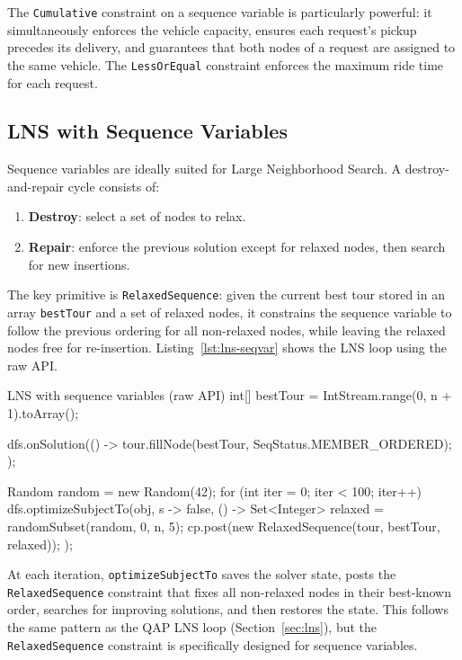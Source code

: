 \documentclass[11pt, a4paper]{scrartcl}
\begin{document}
The \texttt{Cumulative} constraint on a sequence variable is particularly powerful: it simultaneously enforces the vehicle capacity, ensures each request's pickup precedes its delivery, and guarantees that both nodes of a request are assigned to the same vehicle. The \texttt{LessOrEqual} constraint enforces the maximum ride time for each request.

\subsection{LNS with Sequence Variables}
\label{sec:lns-seqvar}

Sequence variables are ideally suited for Large Neighborhood Search. A destroy-and-repair cycle consists of:
\begin{enumerate}
    \item \textbf{Destroy}: select a set of nodes to relax.
    \item \textbf{Repair}: enforce the previous solution except for relaxed nodes, then search for new insertions.
\end{enumerate}

The key primitive is \texttt{RelaxedSequence}: given the current best tour stored in an array \texttt{bestTour} and a set of relaxed nodes, it constrains the sequence variable to follow the previous ordering for all non-relaxed nodes, while leaving the relaxed nodes free for re-insertion. 
Listing~\ref{lst:lns-seqvar} shows the LNS loop using the raw API.

\begin{codebox}[label={lst:lns-seqvar}]{LNS with sequence variables (raw API)}
int[] bestTour = IntStream.range(0, n + 1).toArray();

dfs.onSolution(() -> {
    tour.fillNode(bestTour, SeqStatus.MEMBER_ORDERED);
});

Random random = new Random(42);
for (int iter = 0; iter < 100; iter++) {
    dfs.optimizeSubjectTo(obj, s -> false, () -> {
        Set<Integer> relaxed = randomSubset(random, 0, n, 5);
        cp.post(new RelaxedSequence(tour, bestTour, relaxed));
    });
}
\end{codebox}

At each iteration, \texttt{optimizeSubjectTo} saves the solver state, posts the \texttt{RelaxedSequence} constraint that fixes all non-relaxed nodes in their best-known order, searches for improving solutions, and then restores the state. 
This follows the same pattern as the QAP LNS loop (Section~\ref{sec:lns}), but the \texttt{RelaxedSequence} constraint is specifically designed for sequence variables.
\end{document}
